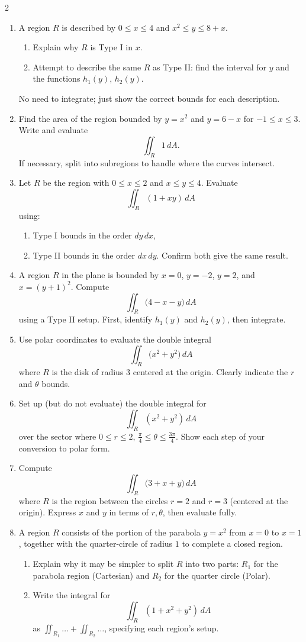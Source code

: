 \begin{multicols}{2}
\begin{enumerate}
\item A region $R$ is described by $0 \le x \le 4$ and $x^2 \le y \le 8 + x$.  
\begin{enumerate}
\item Explain why $R$ is Type I in $x$.  
\item Attempt to describe the same $R$ as Type II: find the interval for $y$ and the functions $h_1(y)$, $h_2(y)$.
\end{enumerate}
No need to integrate; just show the correct bounds for each description.

\item Find the area of the region bounded by $y = x^2$ and $y = 6 - x$ for $-1 \le x \le 3$. Write and evaluate
\[
\iint_R 1 \,dA.
\]
If necessary, split into subregions to handle where the curves intersect.

\item Let $R$ be the region with $0 \le x \le 2$ and $x \le y \le 4$. Evaluate
\[
\iint_R (1 + xy)\, dA
\]
using:  
\begin{enumerate}
\item Type I bounds in the order $dy\,dx$,  
\item Type II bounds in the order $dx\,dy$.  
Confirm both give the same result.
\end{enumerate}

\item A region $R$ in the plane is bounded by $x=0$, $y=-2$, $y=2$, and $x = (y+1)^2$. Compute
\[
\iint_R \bigl(4 - x - y\bigr)\, dA
\]
using a Type II setup. First, identify $h_1(y)$ and $h_2(y)$, then integrate.

\item Use polar coordinates to evaluate the double integral
\[
\iint_R \bigl(x^2 + y^2\bigr)\, dA
\]
where $R$ is the disk of radius $3$ centered at the origin. Clearly indicate the $r$ and $\theta$ bounds.

\item Set up (but do not evaluate) the double integral for
\[
\iint_R (x^2 + y^2) \, dA
\]
over the sector where $0 \le r \le 2$, $\frac{\pi}{4} \le \theta \le \frac{3\pi}{4}$. Show each step of your conversion to polar form.

\item Compute
\[
\iint_R \bigl(3 + x + y\bigr)\, dA
\]
where $R$ is the region between the circles $r=2$ and $r=3$ (centered at the origin). Express $x$ and $y$ in terms of $r,\theta$, then evaluate fully.

\item A region $R$ consists of the portion of the parabola $y = x^2$ from $x=0$ to $x=1$, together with the quarter-circle of radius $1$ to complete a closed region.  
\begin{enumerate}
\item Explain why it may be simpler to split $R$ into two parts: $R_1$ for the parabola region (Cartesian) and $R_2$ for the quarter circle (Polar).  
\item Write the integral for 
\[
\iint_R (1 + x^2 + y^2)\,dA
\]
as $\iint_{R_1} \dots + \iint_{R_2} \dots$, specifying each region’s setup.
\end{enumerate}


\end{enumerate}
\end{multicols}
